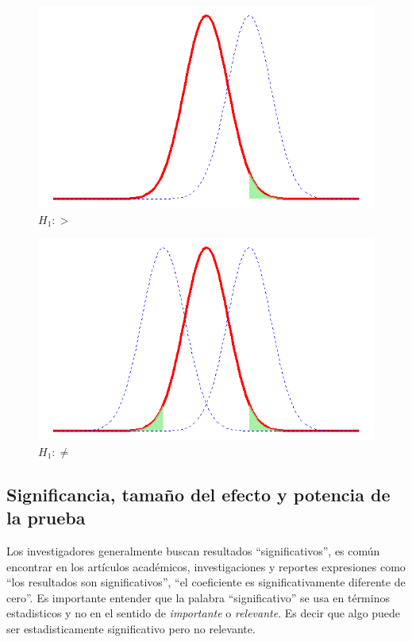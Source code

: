\documentclass[letterpaper,]{book}
\begin{document}
\begin{figure}[h!]

{\centering \includegraphics[width=0.6\linewidth]{phmore} 

}

\caption{$H_1:>$}\label{fig:phmore}
\end{figure}

\begin{figure}[h!]

{\centering \includegraphics[width=0.6\linewidth]{ph2c} 

}

\caption{$H_1:\neq$}\label{fig:ph2c}
\end{figure}

\hypertarget{significancia-tamano-del-efecto-y-potencia-de-la-prueba}{%
\subsection{Significancia, tamaño del efecto y potencia de la prueba}\label{significancia-tamano-del-efecto-y-potencia-de-la-prueba}}

Los investigadores generalmente buscan resultados ``significativos'', es común encontrar en los artículos académicos, investigaciones y reportes expresiones como ``los resultados son significativos'', ``el coeficiente es significativamente diferente de cero''. Es importante entender que la palabra ``significativo'' se usa en términos estadisticos y no en el sentido de \emph{importante} o \emph{relevante}. Es decir que algo puede ser estadisticamente significativo pero no relevante.
\end{document}
